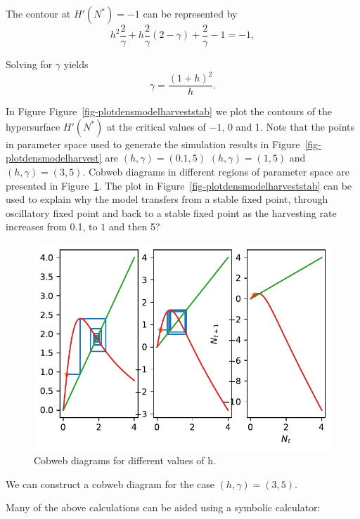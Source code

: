 \documentclass[
  letterpaper,
  DIV=11,
  numbers=noendperiod]{scrreprt}
\begin{document}
The contour at \(H'(N^*)=-1\) can be represented by \[
 h^2\frac{2}{\gamma} + h\frac{2}{\gamma}(2-\gamma) + \frac{2}{\gamma}-1 = -1,
\]

Solving for \(\gamma\) yields \[
\gamma=\frac{(1+h)^2}{h}.
\]

In Figure Figure~\ref{fig-plotdensmodelharveststab} we plot the contours
of the hypersurface \(H'(N^*)\) at the critical values of \(-1\), \(0\)
and 1. Note that the points in parameter space used to generate the
simulation results in Figure~\ref{fig-plotdensmodelharvest} are
\((h,\gamma)=(0.1,5)\) \((h,\gamma)=(1,5)\) and \((h,\gamma)=(3,5)\).
Cobweb diagrams in different regions of parameter space are presented in
Figure~\ref{fig-densharvestingmodelcobweb}. The plot in
Figure~\ref{fig-plotdensmodelharveststab} can be used to explain why the
model transfers from a stable fixed point, through oscillatory fixed
point and back to a stable fixed point as the harvesting rate increases
from 0.1, to \(1\) and then 5?

\begin{figure}

{\centering \includegraphics{MA32009-SinglePopDiscreteTimea_files/figure-pdf/fig-densharvestingmodelcobweb-output-1.pdf}

}

\caption{\label{fig-densharvestingmodelcobweb}Cobweb diagrams for
different values of h.}

\end{figure}

We can construct a cobweb diagram for the case \((h,\gamma)=(3,5)\).

Many of the above calculations can be aided using a symbolic calculator:
\end{document}

